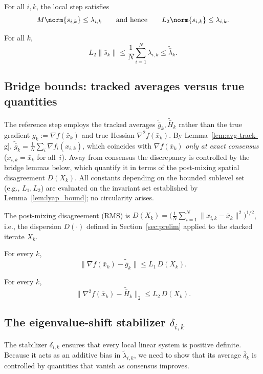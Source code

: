 \documentclass[review,onefignum,onetabnum]{siamart171218}
\begin{document}
\begin{lemma}\label{lem:M-vs-s}
For all $i,k$, the local step satisfies
\[
M\norm{s_{i,k}}\le \lambda_{i,k}
\qquad\text{and hence}\qquad
L_2\norm{s_{i,k}}\le \lambda_{i,k}.
\]
\end{lemma}

\begin{lemma}\label{lem:avg-regime}
For all $k$,
\[
L_2\|\bar s_k\|\le \frac1N\sum_{i=1}^N \lambda_{i,k}\le \tilde{\bar\lambda}_k.
\]
\end{lemma}

\subsection{Bridge bounds: tracked averages versus true quantities}\label{ssec:bridge}
The reference step employs the tracked averages
$\tilde{\bar g}_k,\tilde{\bar H}_k$ rather than the true gradient
$g_k:=\nabla f(\bar x_k)$ and true Hessian
$\nabla^2 f(\bar x_k)$.
By Lemma~\ref{lem:avg-track-g},
$\tilde{\bar g}_k = \frac{1}{N}\sum_{i}\nabla f_i(x_{i,k})$,
which coincides with $\nabla f(\bar x_k)$ \emph{only at exact
consensus} ($x_{i,k}=\bar x_k$ for all~$i$).
Away from consensus the discrepancy is controlled by the
bridge lemmas below, which quantify it in terms of the
post-mixing spatial disagreement $D(X_k)$.
All constants depending on the bounded sublevel set
(e.g., $L_1,L_2$) are evaluated on the invariant set
established by Lemma~\ref{lem:lyap_bound}; no circularity arises.

The post-mixing disagreement (RMS) is
$D(X_k)=\bigl(\frac1N\sum_{i=1}^N \|x_{i,k}-\bar x_k\|^2\bigr)^{1/2}$,
i.e., the dispersion $D(\cdot)$ defined in Section~\ref{sec:prelim}
applied to the stacked iterate $X_k$.

\begin{lemma}\label{lem:bridge-grad}
For every $k$,
\[
\|\nabla f(\bar x_k)-\tilde{\bar g}_k\|\le L_1\,D(X_k).
\]
\end{lemma}

\begin{lemma}\label{lem:bridge-hess}
For every $k$,
\[
\|\nabla^2 f(\bar x_k)-\tilde{\bar H}_k\|_2\le L_2\,D(X_k).
\]
\end{lemma}

\subsection{The eigenvalue-shift stabilizer \texorpdfstring{$\delta_{i,k}$}{delta\_ik}}\label{ssec:stab}
The stabilizer $\delta_{i,k}$ ensures that every local linear system
is positive definite.
Because it acts as an additive bias in $\tilde\lambda_{i,k}$, we need
to show that its average $\bar\delta_k$ is controlled by quantities
that vanish as consensus improves.
\end{document}
